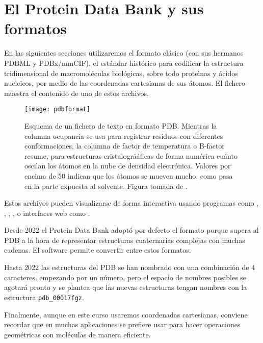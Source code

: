 \section{El Protein Data Bank y sus formatos} \label{PDBformat}

En las siguientes secciones utilizaremos el formato cl\'{a}sico
(con sus hermanos PDBML y PDBx/mmCIF),
el est\'{a}ndar hist\'{o}rico para codificar la estructura tridimensional de macromol\'{e}culas biol\'{o}gicas, 
sobre todo prote\'\i{}nas y \'{a}cidos nucleicos, por medio de las coordenadas cartesianas de sus \'{a}tomos.
El fichero 
muestra el contenido de uno de estos archivos.

\begin{figure}
\begin{center}
\texttt{[image: pdbformat]}
\caption%
{
Esquema de un fichero de texto en formato PDB. 
Mientras la columna ocupancia se usa para registrar residuos con diferentes conformaciones,
la columna de factor de temperatura o B-factor resume, para estructuras cristalográ\'{a}ficas 
de forma num\'{e}rica cu\'{a}nto oscilan los \'{a}tomos en la nube de densidad electr\'{o}nica.
Valores por encima de 50 indican que los átomos se mueven mucho, como pasa en la parte expuesta al solvente.
Figura tomada de 
.
}
\label{fig:pdbformat}
\end{center}
\end{figure}


Estos archivos pueden visualizarse de forma interactiva usando programas como 
,
,
,
,
o interfaces web como 
.

Desde 2022 el Protein Data Bank adopt\'{o} por defecto el formato 
 porque supera al PDB a la hora de 
representar estructuras cuaternarias complejas con muchas cadenas. 
El software
 permite convertir entre 
estos formatos.

Hasta 2022 las estructuras del PDB se han nombrado con una combinaci\'{o}n de 4 caracteres, 
empezando por un n\'{u}mero, pero el espacio de nombres posibles se agotar\'{a} pronto y se plantea
que las nuevas estructuras tengan nombres con la estructura \verb+pdb_00017fgz+.

Finalmente, 
aunque en este curso usaremos coordenadas cartesianas, conviene recordar que en muchas aplicaciones
se prefiere usar  
para hacer operaciones geom\'{e}tricas con mol\'{e}culas de manera eficiente.
